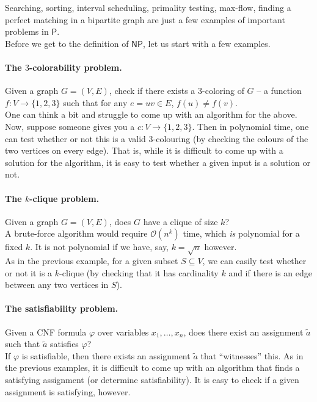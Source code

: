 	Searching, sorting, interval scheduling, primality testing, max-flow, finding a perfect matching in a bipartite graph are just a few examples of important problems in $\mathsf{P}$.\\
	Before we get to the definition of $\mathsf{NP}$, let us start with a few examples.

	\paragraph{The $3$-colorability problem.}
	Given a graph $G=(V,E)$, check if there exists a $3$-coloring of $G$ -- a function $f:V\to\{1,2,3\}$ such that for any $e=uv \in E$, $f(u) \neq f(v)$.\\
	One can think a bit and struggle to come up with an algorithm for the above. Now, suppose someone gives you a $c:V\to\{1,2,3\}$. Then in polynomial time, one can test whether or not this is a valid $3$-colouring (by checking the colours of the two vertices on every edge). That is, while it is difficult to come up with a solution for the algorithm, it is easy to test whether a given input is a solution or not.

	\paragraph{The $k$-clique problem.}
	Given a graph $G=(V,E)$, does $G$ have a clique of size $k$?\\
	A brute-force algorithm would require $\mathcal{O}(n^k)$ time, which \textit{is} polynomial for a fixed $k$. It is not polynomial if we have, say, $k=\sqrt{n}$ however.\\
	As in the previous example, for a given subset $S\subseteq V$, we can easily test whether or not it is a $k$-clique (by checking that it has cardinality $k$ and if there is an edge between any two vertices in $S$).

	\paragraph{The satisfiability problem.}
	Given a CNF formula $\varphi$ over variables $x_1,\ldots,x_n$, does there exist an assignment $\tilde{a}$ such that $\tilde{a}$ satisfies $\varphi$?\\
	If $\varphi$ is satisfiable, then there exists an assignment $\tilde{a}$ that ``witnesses'' this. As in the previous examples, it is difficult to come up with an algorithm that finds a satisfying assignment (or determine satisfiability). It is easy to check if a given assignment is satisfying, however.

